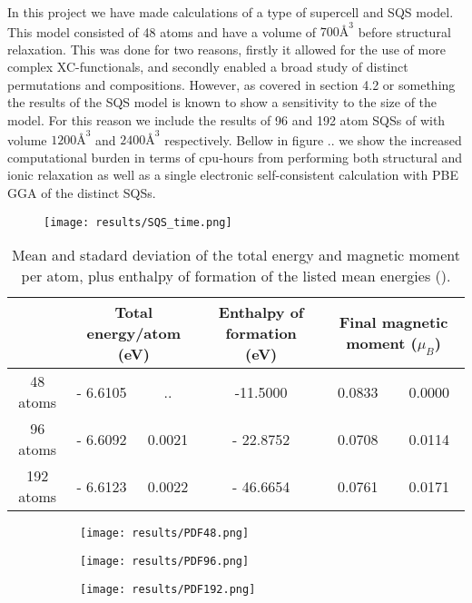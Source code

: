 In this project we have made calculations of a type of supercell and SQS model. This model consisted of 48 atoms and have a volume of $700 Å^3$ before structural relaxation. This was done for two reasons, firstly it allowed for the use of more complex XC-functionals, and secondly enabled a broad study of distinct permutations and compositions. However, as covered in section 4.2 or something the results of the SQS model is known to show a sensitivity to the size of the model. For this reason we include the results of 96 and 192 atom SQSs of  with volume $1200 Å^3$ and $2400 Å^3$ respectively. Bellow in figure .. we show the increased computational burden in terms of cpu-hours from performing both structural and ionic relaxation as well as a single electronic self-consistent calculation with PBE GGA of the distinct SQSs. 

\begin{figure}[H]
\centering
\texttt{[image: results/SQS\_time.png]}
\end{figure}

\begin{table}[h!]
\hskip-2cm\begin{tabular}{@{}cccccc@{}}
\toprule
       & \multicolumn{2}{c}{Total energy/atom (eV)} & Enthalpy of formation (eV) & \multicolumn{2}{c}{Final magnetic moment ($\mu_B$)} \\ \midrule
48 atoms & - 6.6105 & .. & -11.5000 & 0.0833 & 0.0000    \\
96 atoms & - 6.6092  & 0.0021 & - 22.8752  & 0.0708  & 0.0114     \\
192 atoms & - 6.6123  & 0.0022 & - 46.6654 & 0.0761 & 0.0171     \\ \bottomrule
\end{tabular}
\caption{Mean and stadard deviation of the total energy and magnetic moment per atom, plus enthalpy of formation of the listed mean energies ().}
\end{table}


\begin{figure}[H]
\begin{subfigure}{\textwidth}
\texttt{[image: results/PDF48.png]}
\end{subfigure}
\begin{subfigure}{\textwidth}
\texttt{[image: results/PDF96.png]}
\end{subfigure}
\begin{subfigure}{\textwidth}
\texttt{[image: results/PDF192.png]}
\end{subfigure}
\end{figure}


